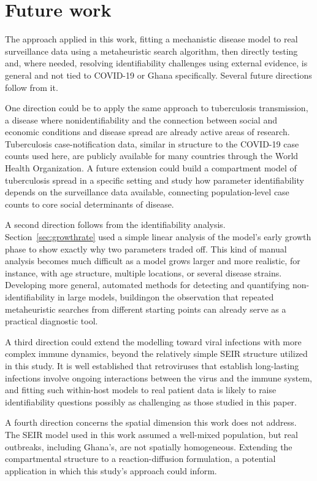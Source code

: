 \documentclass[journal]{IEEEtran}
\begin{document}
\section{Future work}

The approach applied in this work, fitting a mechanistic disease model to real surveillance data using a metaheuristic search algorithm, then directly testing and, where needed, resolving identifiability challenges using external evidence, is general and not tied to COVID-19 or Ghana specifically. Several future directions follow from it.

One direction could be to apply the same approach to tuberculosis
transmission, a disease where nonidentifiability and the connection between social and economic conditions and disease spread are already active areas of research. Tuberculosis case-notification data, similar in structure to the COVID-19 case counts used here, are publicly available for many countries through the World Health Organization. A future extension could build a compartment model of tuberculosis
spread in a specific setting and study how parameter identifiability depends on the surveillance data available, connecting population-level case counts to core social determinants of disease.

A second direction follows from the identifiability analysis. Section~\ref{sec:growthrate} used a simple linear analysis of the model's early growth phase to show exactly why two parameters traded off. This kind of manual analysis becomes much difficult as a model grows larger and more realistic, for instance, with age structure, multiple locations, or several disease strains.
Developing more general, automated methods for detecting and quantifying non-identifiability in large models, buildingon the observation that repeated  metaheuristic searches from different starting points can already serve as a practical diagnostic tool.

A third direction could extend the modelling toward viral infections with more complex immune dynamics, beyond the relatively simple SEIR structure utilized in this study. It is well established that retroviruses that establish long-lasting infections involve ongoing interactions between the virus and the immune system, and fitting such within-host models to real patient data is likely to raise identifiability questions possibly as challenging as those studied in this paper.

A fourth direction concerns the spatial dimension this work does not address. The SEIR model used in this work assumed a well-mixed population, but real outbreaks, including Ghana's, are not spatially homogeneous. Extending the compartmental structure to a reaction-diffusion formulation, a potential application in which this study's approach could inform.
\end{document}
